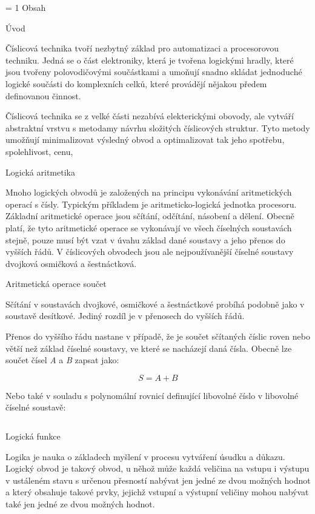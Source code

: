 




\pageno = 1
\nonum\notoc\sec Obsah

\maketoc

\vfill\break

\pagenumbers

\chap Úvod

Číslicová technika tvoří nezbytný základ pro automatizaci a procesorovou techniku. Jedná se o část elektroniky, která je tvořena logickými hradly, které jsou tvořeny polovodičovými součástkami a umoňují snadno skládat jednoduché logické součásti do komplexních celků, které provádějí nějakou předem definovanou činnost. 

Číslicová technika se z velké části nezabívá elekterickými obovody, ale vytváří abstraktní vrstvu s metodamy návrhu složitých číslicových struktur. Tyto metody umožňují minimalizovat výsledný obvod a optimalizovat tak jeho spotřebu, spolehlivost, cenu, \atd  


\chap Logická aritmetika

Mnoho logických obvodů je založených na principu vykonávání aritmetických operací s čísly. Typickým příkladem je aritmeticko-logická jednotka procesoru. Základní aritmetické operace jsou sčítání, odčítání, násobení a dělení. Obecně platí, že tyto aritmetické operace se vykonávají ve všech číselných soustavách stejně, pouze musí být vzat v úvahu základ dané soustavy a jeho přenos do vyšších řádů. V číslicových obvodech jsou ale nejpoužívanější číselné soustavy dvojková osmičková a šestnáctková.

\sec Aritmetická operace součet

Sčítání v soustavách dvojkové, osmičkové a šestnáctkové probíhá podobně jako v soustavě desítkové. Jediný rozdíl je v přenosech do vyšších řádů.

Přenos do vyššího řádu nastane v případě, že je součet sčítaných číslic roven nebo větší než základ číselné soustavy, ve které se nacházejí daná čísla. Obecně lze součet čísel {\it A} a {\it B} zapsat jako:

$$ S = A + B $$

Nebo také v souladu s polynomální rovnicí definující libovolné číslo v libovolné číselné soustavě:

$$  $$

\chap Logická funkce

Logika je nauka o základech myšlení v procesu vytváření úsudku a důkazu. Logický obvod je takový obvod, u něhož může každá veličina na vstupu i výstupu v ustáleném stavu s určenou přesností nabývat jen jedné ze dvou možných hodnot a který obsahuje takové prvky, jejichž vstupní a výstupní veličiny mohou nabývat také jen jedné ze dvou možných hodnot. 

